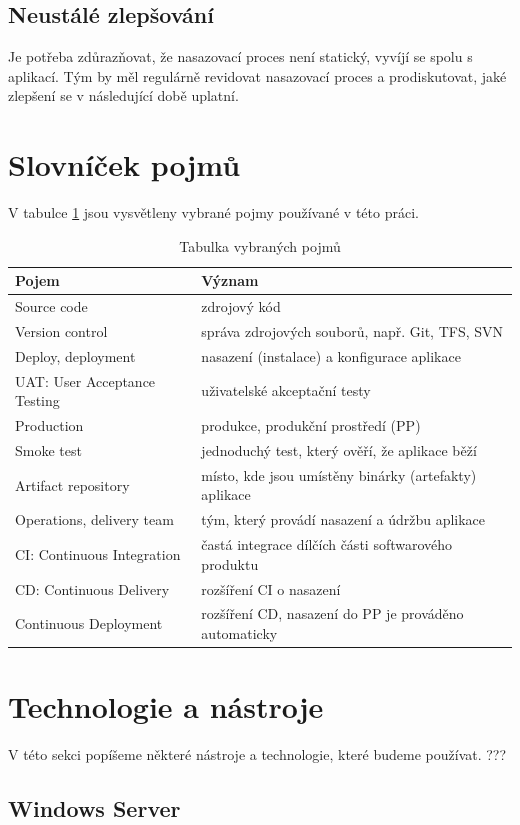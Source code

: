 \subsection{Neustálé zlepšování}
Je potřeba zdůrazňovat, že nasazovací proces není statický, vyvíjí se spolu s aplikací. Tým by měl regulárně revidovat nasazovací proces a prodiskutovat, jaké zlepšení se v následující době uplatní.

\section{Slovníček pojmů}
V tabulce \ref{tab:pojmy} jsou vysvětleny vybrané pojmy používané v této práci.

\begin{table}[]

\caption{Tabulka vybraných pojmů}
\label{tab:pojmy}
\begin{tabular}{l|l}
Pojem & Význam \\ \hline
Source code & zdrojový kód \\
Version control & správa zdrojových souborů, např. Git, TFS, SVN \\
Deploy, deployment & nasazení (instalace) a konfigurace aplikace \\
UAT: User Acceptance Testing & uživatelské akceptační testy  \\
Production & produkce, produkční prostředí (PP)  \\
Smoke test & jednoduchý test, který ověří, že aplikace běží \\
Artifact repository & místo, kde jsou umístěny binárky (artefakty) aplikace \\
Operations, delivery team & tým, který provádí nasazení a údržbu aplikace \\
CI: Continuous Integration & častá integrace dílčích části softwarového produktu \\
CD: Continuous Delivery & rozšíření CI o nasazení \\
Continuous Deployment & rozšíření CD, nasazení do PP je prováděno automaticky
\end{tabular}
\end{table}

\section{Technologie a nástroje}
V této sekci popíšeme některé nástroje a technologie, které budeme používat. ???

\subsection{Windows Server}

